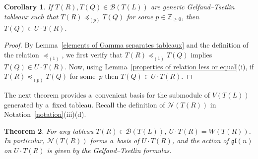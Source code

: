 \documentclass[pdftex]{sigma}
\numberwithin{equation}{section}
\newtheorem{Theorem}{Theorem}[section]
\newtheorem{Corollary}[Theorem]{Corollary}
\begin{document}
\begin{Corollary}\label{Gelfand--Tsetlin modules property}\sloppy
If $T(R), T(Q)\in \mathcal{B}(T(L))$ are generic Gelfand--Tsetlin tableaux such that
\mbox{$T(R)\preceq_{(p)} T(Q)$} for some $p\in\mathbb{Z}_{\geq 0}$, then $T(Q)\in U\cdot T(R)$.
\end{Corollary}
\begin{proof}
By Lemma~\ref{elements of Gamma separates tableaux} and the def\/inition of the relation $\preceq_{(1)}$, we f\/irst verify
that ${T(R)\preceq_{(1)}\! T(Q)}$ implies $T(Q)\in U\cdot T(R)$.
Now, using Lemma~\ref{properties of relation less or equal}(i), if $T(R)\preceq_{(p)} T(Q)$ for some~$p$ then $T(Q)\in
U\cdot T(R)$.
\end{proof}

The next theorem provides a~convenient basis for the submodule of $V(T(L))$ generated by a~f\/ixed tableau.
Recall the def\/inition of $\mathcal{N}(T(R))$ in Notation~\ref{notation}(iii)(d).

\begin{Theorem}
\label{basis of submodule generated by T}
For any tableau $T(R)\in\mathcal{B}(T(L))$, $U\cdot T(R)= W(T(R))$.
In particular, $\mathcal{N}(T(R))$ forms a~basis of $U\cdot T(R)$, and the action of $\mathfrak{gl}(n)$ on $U\cdot T(R)$
is given by the Gelfand--Tsetlin formulas.
\end{Theorem}
\end{document}
